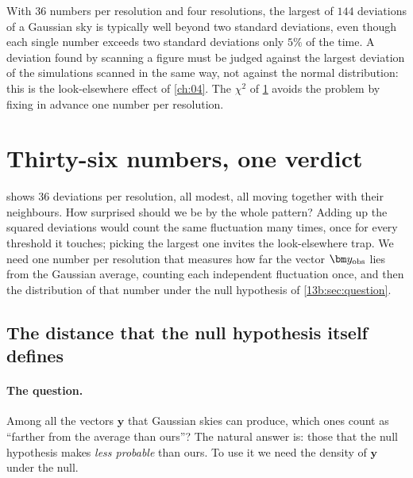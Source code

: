 \begin{pitfall}
With $36$ numbers per resolution and four resolutions, the largest of $144$ deviations of a Gaussian sky is
typically well beyond two standard deviations, even though each single number exceeds two standard deviations
only $5\%$ of the time. A deviation found by scanning a figure must be judged against the largest deviation of the
simulations scanned in the same way, not against the normal distribution: this is the look-elsewhere effect of
\cref{ch:04}. The $\chi^2$ of \cref{13b:sec:chi2} avoids the problem by fixing in advance one number per
resolution.
\end{pitfall}
\section{Thirty-six numbers, one verdict}
\label{13b:sec:chi2}

 shows $36$ deviations per resolution, all modest, all moving together with their
neighbours. How surprised should we be by the whole pattern? Adding up the squared deviations would count the
same fluctuation many times, once for every threshold it touches; picking the largest one invites the
look-elsewhere trap. We need one number per resolution that measures how far the vector $\bm y_{\rm obs}$ lies
from the Gaussian average, counting each independent fluctuation once, and then the distribution of that number
under the null hypothesis of \cref{13b:sec:question}.

\subsection{The distance that the null hypothesis itself defines}
\label{13b:sec:mahalanobis}

\paragraph{The question.} Among all the vectors $\bm y$ that Gaussian skies can produce, which ones count as
``farther from the average than ours''? The natural answer is: those that the null hypothesis makes \emph{less
probable} than ours. To use it we need the density of $\bm y$ under the null.

